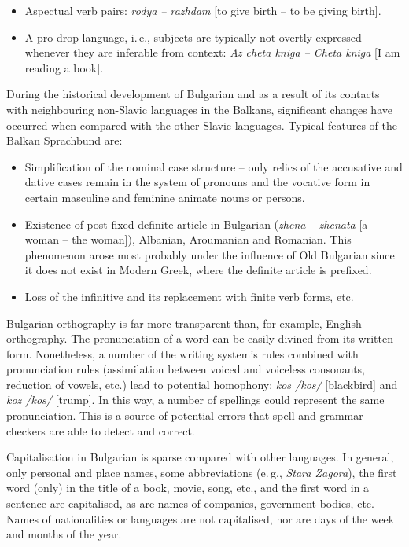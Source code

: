 \begin{multicols}{2}
\begin{itemize}
  \item Aspectual verb pairs: \textit{{rodya -- razhdam}} [to give birth – to be giving birth].

  \item A pro-drop language, i.\,e., subjects are typically not overtly expressed whenever they are inferable from context: \textit{{Az cheta kniga -- Cheta kniga}} [I am reading a book]. 
  \end{itemize}

  During the historical development of Bulgarian and as a result of its contacts with neighbouring non-Slavic languages in the Balkans, significant changes have occurred when compared with the other Slavic languages. Typical features of the Balkan Sprachbund are:

  \begin{itemize}
  \item Simplification of the nominal case structure -- only relics of the accusative and dative cases remain in the system of pronouns and the vocative form in certain masculine and feminine animate nouns or persons.

  \item Existence of post-fixed definite article in Bulgarian (\textit{{zhena -- zhenata}} [a woman -- the woman]), Albanian, Aroumanian and Romanian. This phenomenon arose most probably under the influence of Old Bulgarian since it does not exist in Modern Greek, where the definite article is prefixed.

  \item Loss of the infinitive and its replacement with finite verb forms, etc. 
  \end{itemize}

  Bulgarian orthography is far more transparent than, for example, English orthography. The pronunciation of a word can be easily divined from its written form. Nonetheless, a number of the writing system's rules combined with pronunciation rules (assimilation between voiced and voiceless consonants, reduction of vowels, etc.) lead to potential homophony: \textit{{kos} /kos/} [blackbird] and \textit{{koz /kos/}} [trump]. In this way, a number of spellings could represent the same pronunciation. This is a source of potential errors that spell and grammar checkers are able to detect and correct.

  Capitalisation in Bulgarian is sparse compared with other languages. In general, only personal and place names, some abbreviations (e.\,g., \textit{Stara Zagora}), the first word (only) in the title of a book, movie, song, etc., and the first word in a sentence are capitalised, as are names of companies, government bodies, etc. Names of nationalities or languages are not capitalised, nor are days of the week and months of the year.


\end{multicols}

